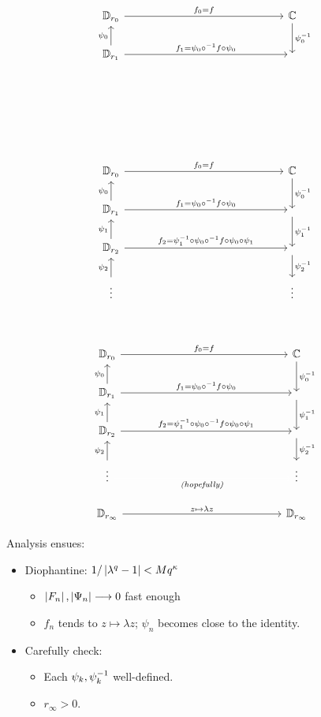 \begin{frame}
\[
\begin{tikzcd}[ampersand replacement=\&]
\D_{r_0} \ar[r, "f_0 = f"] \&[12em] \C
\ar[d, "\psi_0\inv"]
\\
\D_{r_1} \ar[u, "\psi_0"]
\ar[r, "f_1 = \psi_0 \circ \inv f \circ \psi_0"]
\&{}
\\
{}\&{} \\
{}\&{} \\
{}\&{}
\end{tikzcd}
\]
\end{frame}
\begin{frame}
\[
\begin{tikzcd}[ampersand replacement=\&]
\D_{r_0} \ar[r, "f_0 = f"] \&[12em] \C
\ar[d, "\psi_0\inv"]
\\
\D_{r_1} \ar[u, "\psi_0"]
\ar[r, "f_1 = \psi_0 \circ \inv f \circ \psi_0"]
\&
\ar[d, "\psi_1\inv"]
\\
\D_{r_2} \ar[u, "\psi_1"]
\ar[r, "f_2 = \psi_1\inv \circ \psi_0 \circ \inv f \circ \psi_0 \circ \psi_1"]
\&
\ar[d, "\psi_2\inv"] \\
\vdots
\ar[u, "\psi_2"]
\&
\vdots\\
{}
\&
{}
\end{tikzcd}
\]
\end{frame}

\begin{frame}
\[
\begin{tikzcd}[ampersand replacement=\&]
\D_{r_0} \ar[r, "f_0 = f"] \&[12em] \C
\ar[d, "\psi_0\inv"]
\\
\D_{r_1} \ar[u, "\psi_0"]
\ar[r, "f_1 = \psi_0 \circ \inv f \circ \psi_0"]
\&
\ar[d, "\psi_1\inv"]
\\
\D_{r_2} \ar[u, "\psi_1"]
\ar[r, "f_2 = \psi_1\inv \circ \psi_0 \circ \inv f \circ \psi_0 \circ \psi_1"]
\&
\ar[d, "\psi_2\inv"] \\
\vdots
\ar[r, color=white, "\textit{\color{black}(hopefully)}"']
\ar[u, "\psi_2"]
\&
\vdots\\
\D_{r_\infty} \ar[r, "z \mapsto \lambda z"]
\&
\D_{r_\infty}
\end{tikzcd}
\]
\end{frame}

\begin{frame}
Analysis ensues:
\begin{itemize}
    \pause \item Diophantine: $1/\left|\lambda^q - 1\right| < M q^\kappa$
    \begin{itemize}
        \item $\left|F_n\right|, \left|\Psi_n\right| \longrightarrow 0$ fast enough
        \item $f_n$ tends to $z \mapsto \lambda z$; $\psi_n$ becomes close to the identity.
    \end{itemize}
    \pause \item Carefully check:
    \begin{itemize}
        \item Each $\psi_k, \psi_k^{-1}$ well-defined.
        \item $r_\infty > 0$.
    \end{itemize}
\end{itemize}
\end{frame}

